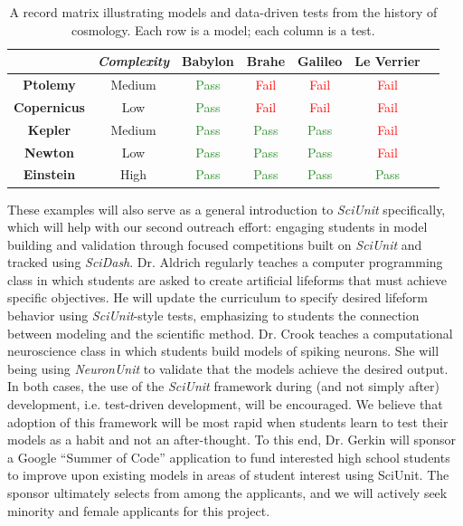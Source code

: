 \documentclass[11pt,letterpaper]{article}
\begin{document}
\begin{table}
\vspace{-7px}
\caption{A record matrix illustrating models and data-driven tests from the history of cosmology. Each row is a model; each column is a test.}
\label{table:record_matrix}
\begin{tabular}{| c | c | c | c | c | c | c }
\hline
		& \textit{Complexity} & \textbf{Babylon} & \textbf{Brahe} & \textbf{Galileo} & \textbf{Le Verrier} \\ \hline
	\textbf{Ptolemy} & Medium & \textcolor{ForestGreen}{Pass} & \textcolor{Red}{Fail} & \textcolor{Red}{Fail} & \textcolor{Red}{Fail} \\ \hline
	\textbf{Copernicus} & Low & \textcolor{ForestGreen}{Pass} & \textcolor{Red}{Fail} & \textcolor{Red}{Fail} & \textcolor{Red}{Fail} \\ \hline
	\textbf{Kepler} & Medium & \textcolor{ForestGreen}{Pass} & \textcolor{ForestGreen}{Pass} & \textcolor{ForestGreen}{Pass} & \textcolor{Red}{Fail} \\ \hline
	\textbf{Newton} & Low & \textcolor{ForestGreen}{Pass} & \textcolor{ForestGreen}{Pass} & \textcolor{ForestGreen}{Pass} & \textcolor{Red}{Fail} \\ \hline
	\textbf{Einstein} & High & \textcolor{ForestGreen}{Pass} & \textcolor{ForestGreen}{Pass} & \textcolor{ForestGreen}{Pass} & \textcolor{ForestGreen}{Pass} \\ \hline
\end{tabular}
\end{table}

These examples will also serve as a general introduction to \textit{SciUnit} specifically, which will help with our second outreach effort: engaging students in model building and validation through focused competitions built on \textit{SciUnit} and tracked using \textit{SciDash}.
Dr. Aldrich regularly teaches a computer programming class in which students are asked to create artificial lifeforms that must achieve specific objectives.
He will update the curriculum to specify desired lifeform behavior using \textit{SciUnit}-style tests, emphasizing to students the connection between modeling and the scientific method.
Dr. Crook teaches a computational neuroscience class in which students build models of spiking neurons.
She will being using \textit{NeuronUnit} to validate that the models achieve the desired output.
In both cases, the use of the \textit{SciUnit} framework during (and not simply after) development, i.e. test-driven development, will be encouraged.
We believe that adoption of this framework will be most rapid when students learn to test their models as a habit and not an after-thought.
To this end, Dr. Gerkin will sponsor a Google ``Summer of Code'' application \cite{summerofcode} to fund interested high school students to improve upon existing models in areas of student interest using SciUnit.
The sponsor ultimately selects from among the applicants, and we will actively seek minority and female applicants for this project.  
\end{document}
